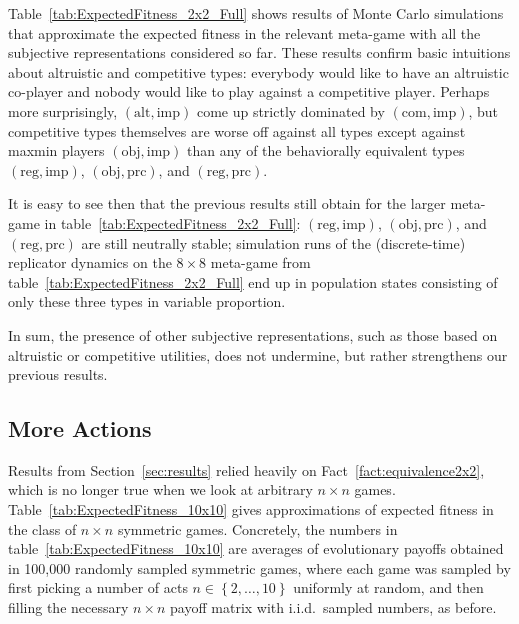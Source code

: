 \documentclass[fleqn,reqno,12pt]{article}
\theoremstyle{Satz}
\theoremstyle{Bsp}
\newcommand{\set}[1]{\left\{#1\right\}}
\newcommand{\myalert}[1]{\textcolor{red}{#1}}
\begin{document}
Table~\ref{tab:ExpectedFitness_2x2_Full} shows results of Monte Carlo simulations that
approximate the expected fitness in the relevant meta-game with all the subjective representations considered so
far. These results confirm basic intuitions about altruistic and competitive types: everybody would like to have an altruistic co-player and nobody
would like to play against a competitive player. Perhaps more surprisingly, $(\text{alt}, \text{imp})$
come up strictly dominated by $(\text{com}, \text{imp})$, but competitive types themselves are worse off
against all types except against maxmin players $(\text{obj}, \text{imp})$ than any of
the behaviorally equivalent types $(\text{reg}, \text{imp})$, $(\text{obj}, \text{prc})$, and
$(\text{reg}, \text{prc})$.
\iffalse This is a noteworthy results in the light of the fact
that evolving altruistic preferences have been shown to support cooperative behavior in a
single stage game \myalert{[CITE]}. In contrast, averaging over payoffs in multiple stage
games, like we do here, makes altruistic preferences prime victims of evolutionary eradication.
\fi
It is easy to see then that the previous results still obtain for the larger meta-game in
table~\ref{tab:ExpectedFitness_2x2_Full}: $(\text{reg}, \text{imp})$,
$(\text{obj}, \text{prc})$, and $(\text{reg}, \text{prc})$ are still neutrally stable;
simulation runs of the (discrete-time) replicator dynamics on the $8 \times 8$ meta-game from
table~\ref{tab:ExpectedFitness_2x2_Full} end up in population states consisting of only these
three types in variable proportion.

In sum, the presence of other subjective representations, such as those based on altruistic or competitive utilities, does not undermine, but rather strengthens our previous results.


                                   
\subsection{More Actions}
\label{sec:n-times-n}

Results from Section~\ref{sec:results} relied heavily on Fact~\ref{fact:equivalence2x2}, which
is no longer true when we look at arbitrary $n \times n$ games.
Table~\ref{tab:ExpectedFitness_10x10} gives approximations of expected fitness in the class of
$n \times n$ symmetric games. Concretely, the numbers in table~\ref{tab:ExpectedFitness_10x10}
are averages of evolutionary payoffs obtained in 100,000 randomly sampled symmetric games,
where each game was sampled by first picking a number of acts $n \in \set{2, \dots, 10}$
uniformly at random, and then filling the necessary $n \times n$ payoff matrix with
i.i.d.~sampled numbers, as before.
\end{document}
